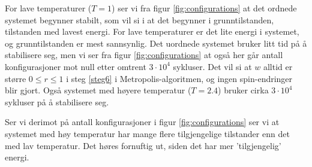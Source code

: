 \documentclass[11pt, twocolumn]{article}
\begin{document}
For lave temperaturer ($T = 1$) ser vi fra figur \ref{fig:configurations} at det ordnede systemet
begynner stabilt, som vil si i at det begynner i grunntilstanden,
tilstanden med lavest energi. For lave temperaturer er det lite energi
i systemet, og grunntilstanden er mest sannsynlig. Det uordnede 
systemet bruker litt tid på å stabilisere seg, men vi ser fra
figur \ref{fig:configurations} at også her går antall konfigurasjoner mot null
etter omtrent $3 \cdot 10^4$ sykluser. Det vil si at $w$ alltid er
større $0\leq r\leq 1$ i steg \ref{steg6} i Metropolis-algoritmen,
og ingen spin-endringer blir gjort. Også systemet med høyere
temperatur ($T=2.4$) bruker cirka $3 \cdot 10^4$ sykluser på å
stabilisere seg.

Ser vi derimot på antall konfigurasjoner i figur \ref{fig:configurations} ser vi at systemet med høy temperatur
har mange flere tilgjengelige tilstander enn det med lav temperatur. Det høres fornuftig ut, siden det har mer
'tilgjengelig' energi.
\end{document}
